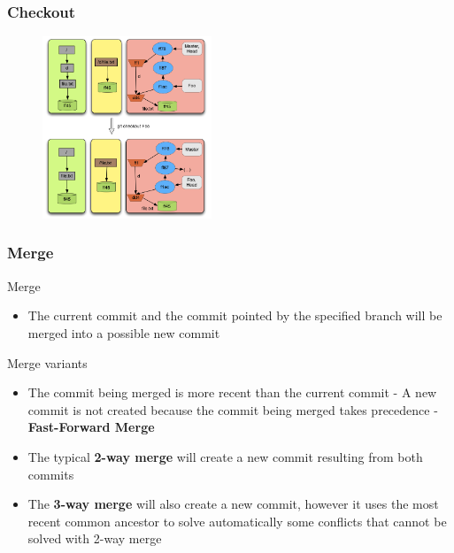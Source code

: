 \documentclass{beamer}
\begin{document}
\begin{frame}[fragile]
   \frametitle{Checkout}
   \begin{figure}
      \centering
      \includegraphics[width=0.45\textwidth]{images/checkout.png}
   \end{figure}
\end{frame}

\begin{frame}
	\frametitle{Merge }
	\begin{block}{Merge}
	   \begin{itemize}
	      \item The current commit and the commit pointed by the specified branch
	      will be merged into a possible new commit
	   \end{itemize}
	\end{block}
	\small
   \begin{block}{Merge variants}
	   \begin{itemize}
		   \item The commit being merged is more recent than
		   the current commit - A new commit is not created because the
         commit being merged takes precedence - \textbf{Fast-Forward Merge}
		   \item The typical \textbf{2-way merge} will create a new commit
		   resulting from both commits
		   \item The \textbf{3-way merge} will also create a new commit, however 
         it uses the most recent common ancestor to solve automatically 
         some conflicts that cannot be solved with 2-way merge
	\end{itemize}
	\end{block}
\end{frame}
\end{document}
